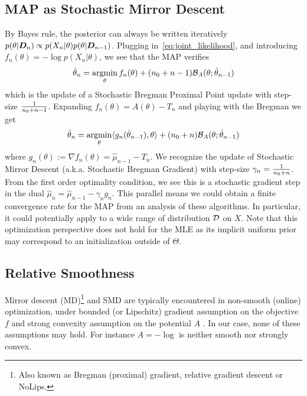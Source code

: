 \documentclass[twoside]{article}
\newcommand{\logpart}{A}
\newcommand{\bregman}{\cB_\logpart}
\newcommand{\nat}{\theta}
\newcommand{\m}{\mu}
\newcommand{\lr}{\gamma} %
\begin{document}
\subsection{MAP as Stochastic Mirror Descent}
\label{ssec:MAP=SMD}
By Bayes rule, the posterior can always be written iteratively $p(\nat | \mD_n) \propto p(X_n | \nat) p(\nat | \mD_{n-1})$.
Plugging in~\eqref{eq:joint_likelihood}, and introducing $f_n(\nat) = - \log p(X_{n} | \nat)$, we see that the MAP verifies
\begin{align*}
	\hat \nat_{n}
	= \argmin_\nat f_n(\nat) + (n_0 + n -1) \bregman(\nat; \hat \nat_{n-1})
\end{align*}
which is the update of a Stochastic Bregman Proximal Point update with step-size $\frac{1}{n_0 + n - 1}$.
Expanding $f_n(\nat) = \logpart(\nat) - T_n$ and  playing with the Bregman we get
\begin{align*}
		\hat \nat_{n}
	= \argmin_\nat \langle g_{n}(\hat \nat_{n-1}), \nat \rangle + (n_0 + n) \bregman(\nat; \hat \nat_{n-1})
\end{align*}
where $g_{n}(\nat) := \nabla f_n(\nat) = \hat \m_{n-1} - T_n$.
We recognize the update of Stochastic Mirror Descent (a.k.a. Stochastic Bregman Gradient) with step-size $\lr_n = \inv{n_0 + n}$.
From the first order optimality condition, we see this is a stochastic gradient step in the dual $\hat \m_n = \hat \m_{n-1} - \lr_n g_n$.
This parallel means we could obtain a finite convergence rate for the  MAP from an analysis of these algorithms.
In particular, it could potentially apply to a wide range of distribution ${\mathcal D}$ on $X$.
Note that this optimization perspective does not hold for the MLE %
as its implicit uniform prior may correspond to an initialization outside of $\Theta$.

\subsection{Relative Smoothness}
Mirror descent (MD)\footnote{
Also known as
Bregman (proximal) gradient, relative gradient descent or NoLips.
}
\citep{nemirovski1983problem,beck2003mirror}
and SMD 
\citep{nemirovski2009robust,ghadimi2012optimal} 
are typically encountered in non-smooth (online) optimization,
under bounded (or Lipschitz) gradient assumption on the objective $f$
and strong convexity assumption on the potential $\logpart$
\citep[Th.4.2 \& Th.6.3]{bubeck2015convex}.
In our case, none of these assumptions may hold. 
For instance $\logpart = -\log$ is neither smooth nor strongly convex.
\end{document}
